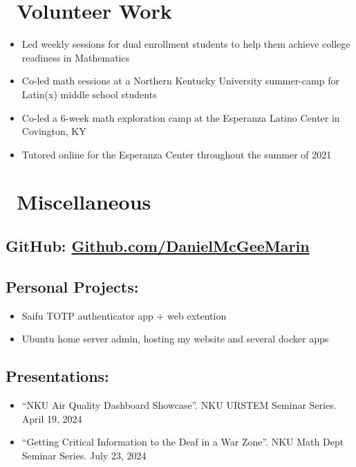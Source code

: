 \documentclass{resume}
\begin{document}
\section{\faHeartO\ Volunteer Work}
\begin{itemize}[parsep=0.5ex]
    \item Led weekly sessions for dual enrollment students to help them achieve college readiness in Mathematics
\end{itemize}
\begin{itemize}[parsep=0.5ex]
    \item Co-led math sessions at a Northern Kentucky University summer-camp for Latin(x) middle school students
\end{itemize}
\begin{itemize}[parsep=0.5ex]
    \item Co-led a 6-week math exploration camp at the Esperanza Latino Center in Covington, KY
    \item Tutored online for the Esperanza Center throughout the summer of 2021
\end{itemize}


\section{\faInfo\ Miscellaneous}
\subsection{GitHub: \href{https://github.com/DanielMcGeeMarin}{Github.com/DanielMcGeeMarin}}
\subsection{Personal Projects:}
\begin{itemize}[parsep=0.5ex]
  \item Saifu TOTP authenticator app + web extention
  \item Ubuntu home server admin, hosting my website and several docker apps
\end{itemize}
\subsection{Presentations:}
\begin{itemize}[parsep=0.5ex]
  \item “NKU Air Quality Dashboard Showcase”. NKU URSTEM Seminar Series. April 19, 2024
  \item “Getting Critical Information to the Deaf in a War Zone”. NKU Math Dept Seminar Series. July 23, 2024
\end{itemize}


%
%
\end{document}

